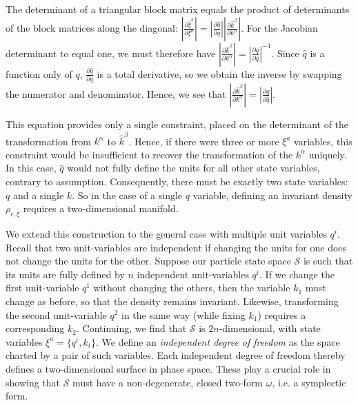 \documentclass[12pt, twoside]{article}
\begin{document}
\noindent
The determinant of a triangular block matrix equals the product of determinants of the block matrices along the diagonal: $ \left|\frac{\partial \hat{\xi}^b}{\partial \xi^a} \right| =  \left|\frac{\partial \hat{q}}{\partial q}\right| \left|\frac{\partial \hat{k}^\beta}{\partial k^\alpha}\right|$. For the Jacobian determinant to equal one, we must therefore have  $\left|\frac{\partial \hat{k}^\beta}{\partial k^\alpha} \right| =   \left|\frac{\partial \hat{q}}{\partial q}\right|^{-1}$. Since $\hat q$ is a function only of $q$, $\frac{\partial \hat{q}}{\partial q}$ is a total derivative, so we obtain the inverse by swapping the numerator and denominator. Hence, we see that $\left|\frac{\partial \hat{k}^\beta}{\partial k^\alpha} \right| = \left|\frac{\partial q}{\partial \hat q} \right|$. 

This equation provides only a single constraint, placed on the determinant of the transformation from $k^\alpha$ to $\hat{k}^\beta$. Hence, if there were three or more $\xi^a$ variables, this constraint would be insufficient to recover the transformation of the $k^\alpha$ uniquely. In this case, $\hat q$  would not fully define the units for all other state variables, contrary to assumption. Consequently, there must be exactly two state variables: $q$ and a single $k$. So in the case of a single $q$ variable, defining an invariant density $\rho_{c, \xi}$ requires a two-dimensional manifold.

We extend this construction to the general case with multiple unit variables $q^i$. Recall that two unit-variables are independent if changing the units for one does not change the units for the other. Suppose our particle state space $\mathcal{S}$ is such that its units are fully defined by $n$ independent unit-variables $q^i$. If we change the first unit-variable $q^1$ without changing the others, then the variable $k_1$ must change as before, so that the density remains invariant. Likewise, transforming the second unit-variable $q^2$ in the same way (while fixing $k_1$) requires a corresponding $k_2$. Continuing, we find that $\mathcal{S}$ is $2n$-dimensional, with state variables $\xi^a = \{ q^i, k_i \}$. We define an \textit{independent degree of freedom} as the space charted by a pair of such variables. Each independent degree of freedom thereby defines a two-dimensional surface in phase space. These play a crucial role in showing that $\mathcal{S}$ must have a non-degenerate, closed two-form $\omega$, i.e. a symplectic form. 
\end{document}
